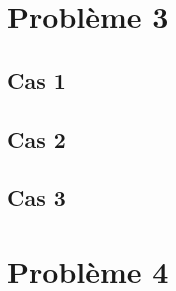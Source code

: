 \section{Probl\`eme 3}

\subsection{Cas 1}

\subsection{Cas 2}

\subsection{Cas 3}

\section{Probl\`eme 4}